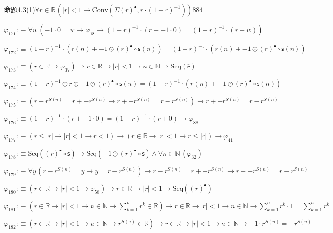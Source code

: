 \begin{fullproof}{命題4.3(1)}{$\forall r \in \mathbb{R}\,(\lvert r \rvert < 1 \to \mathrm{Conv}(\Sigma {(r)^{\bullet}},r \cdot (1 - r)^{-1}))$}{884}
\begin{abbrevlist}
\item $\varphi_{171} :\equiv \forall w\,(-1 \cdot 0 = w \to \varphi_{18} \to (1 - r)^{-1} \cdot (r + -1 \cdot 0) = (1 - r)^{-1} \cdot (r + w))$
\item $\varphi_{172} :\equiv (1 - r)^{-1} \cdot (\overline{r}(n) + -1 \odot {(r)^{\bullet}} \circ \mathsf{s}(n)) = (1 - r)^{-1} \cdot (\overline{r}(n) + -1 \odot {(r)^{\bullet}} \circ \mathsf{s}(n))$
\item $\varphi_{173} :\equiv (r \in \mathbb{R} \to \varphi_{37}) \to r \in \mathbb{R} \to \lvert r \rvert < 1 \to n \in \mathbb{N} \to \mathrm{Seq}(\overline{r})$
\item $\varphi_{174} :\equiv (1 - r)^{-1} \odot \overline{r} \oplus -1 \odot {(r)^{\bullet}} \circ \mathsf{s}(n) = (1 - r)^{-1} \cdot (\overline{r}(n) + -1 \odot {(r)^{\bullet}} \circ \mathsf{s}(n))$
\item $\varphi_{175} :\equiv (r - {{r}^{S(n)}} = r + -{{r}^{S(n)}} \to r + -{{r}^{S(n)}} = r - {{r}^{S(n)}}) \to r + -{{r}^{S(n)}} = r - {{r}^{S(n)}}$
\item $\varphi_{176} :\equiv (1 - r)^{-1} \cdot (r + -1 \cdot 0) = (1 - r)^{-1} \cdot (r + 0) \to \varphi_{88}$
\item $\varphi_{177} :\equiv (r \leq \lvert r \rvert \to \lvert r \rvert < 1 \to r < 1) \to (r \in \mathbb{R} \to \lvert r \rvert < 1 \to r \leq \lvert r \rvert) \to \varphi_{41}$
\item $\varphi_{178} :\equiv \mathrm{Seq}({(r)^{\bullet}} \circ \mathsf{s}) \to \mathrm{Seq}(-1 \odot {(r)^{\bullet}} \circ \mathsf{s}) \land \forall n \in \mathbb{N}\,(\varphi_{32})$
\item $\varphi_{179} :\equiv \forall y\,(r - {{r}^{S(n)}} = y \to y = r - {{r}^{S(n)}}) \to r - {{r}^{S(n)}} = r + -{{r}^{S(n)}} \to r + -{{r}^{S(n)}} = r - {{r}^{S(n)}}$
\item $\varphi_{180} :\equiv (r \in \mathbb{R} \to \lvert r \rvert < 1 \to \varphi_{58}) \to r \in \mathbb{R} \to \lvert r \rvert < 1 \to \mathrm{Seq}({(r)^{\bullet}})$
\item $\varphi_{181} :\equiv (r \in \mathbb{R} \to \lvert r \rvert < 1 \to n \in \mathbb{N} \to {\textstyle\sum_{k=1}^{n} {{r}^{k}}} \in \mathbb{R}) \to r \in \mathbb{R} \to \lvert r \rvert < 1 \to n \in \mathbb{N} \to {\textstyle\sum_{k=1}^{n} {{r}^{k}}} \cdot 1 = {\textstyle\sum_{k=1}^{n} {{r}^{k}}}$
\item $\varphi_{182} :\equiv (r \in \mathbb{R} \to \lvert r \rvert < 1 \to n \in \mathbb{N} \to {{r}^{S(n)}} \in \mathbb{R}) \to r \in \mathbb{R} \to \lvert r \rvert < 1 \to n \in \mathbb{N} \to -1 \cdot {{r}^{S(n)}} = -{{r}^{S(n)}}$

\end{abbrevlist}
\end{fullproof}
